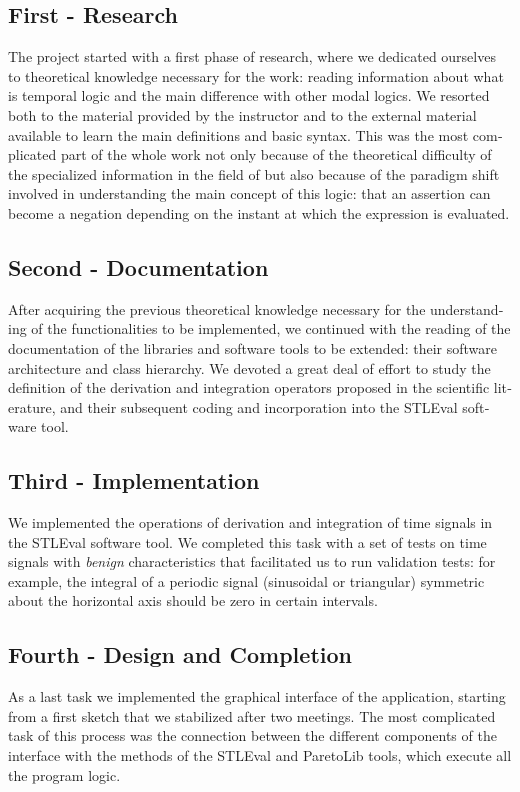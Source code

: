 \begin{otherlanguage}{british}
\subsection{First - Research}
The project started with a first phase of research, where we dedicated ourselves to theoretical knowledge necessary for the work: reading information about what is temporal logic and the main difference with other modal logics.
We resorted both to the material provided by the instructor and to the external material available to learn the main definitions and basic syntax.
This was the most complicated part of the whole work not only because of the theoretical difficulty of the specialized information in the field of 
but also because of the paradigm shift involved in understanding the main concept of this logic: that an assertion can become a negation depending on the instant at which the expression is evaluated.


\subsection{Second - Documentation}
After acquiring the previous theoretical knowledge necessary for the understanding of the functionalities to be implemented, we continued with the reading of the documentation of the libraries and software tools to be extended: their software architecture and class hierarchy. We devoted a great deal of effort to study the definition of the derivation and integration operators proposed in the scientific literature, and their subsequent coding and incorporation into the STLEval software tool.

\subsection{Third - Implementation}
We implemented the operations of derivation and integration of time signals in the STLEval software tool. We completed this task with a set of tests on time signals with \textit{benign} characteristics that facilitated us to run validation tests: for example, the integral of a periodic signal (sinusoidal or triangular) symmetric about the horizontal axis should be zero in  certain intervals.

\subsection{Fourth - Design and Completion}
As a last task we implemented the graphical interface of the application, starting from a first sketch that we stabilized after two meetings. The most complicated task of this process was the connection between the different components of the interface with the methods of the STLEval and ParetoLib tools, which execute all the program logic.


\end{otherlanguage}
